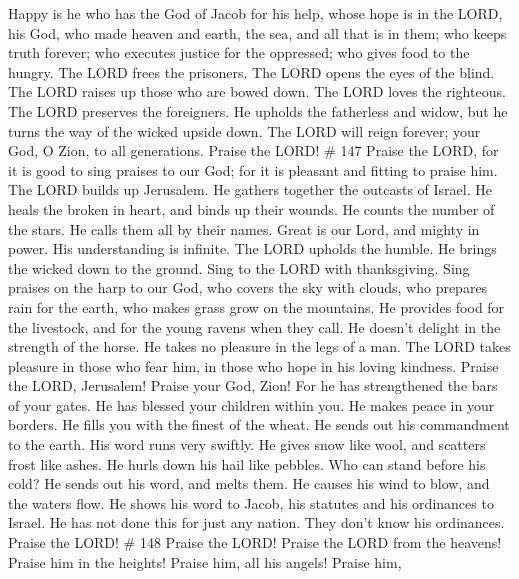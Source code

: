  Happy is he who has the God of Jacob for his help, whose
hope is in the LORD, his God,  who made heaven and earth,
the sea, and all that is in them; who keeps truth forever; 
who executes justice for the oppressed; who gives food to the hungry.
The LORD frees the prisoners.  The LORD opens the eyes of
the blind. The LORD raises up those who are bowed down. The LORD loves
the righteous.  The LORD preserves the foreigners. He
upholds the fatherless and widow, but he turns the way of the wicked
upside down.  The LORD will reign forever; your God, O
Zion, to all generations. Praise the LORD! \# 147  Praise
the LORD, for it is good to sing praises to our God; for it is pleasant
and fitting to praise him.  The LORD builds up Jerusalem. He
gathers together the outcasts of Israel.  He heals the
broken in heart, and binds up their wounds.  He counts the
number of the stars. He calls them all by their names. 
Great is our Lord, and mighty in power. His understanding is infinite.
 The LORD upholds the humble. He brings the wicked down to
the ground.  Sing to the LORD with thanksgiving. Sing
praises on the harp to our God,  who covers the sky with
clouds, who prepares rain for the earth, who makes grass grow on the
mountains.  He provides food for the livestock, and for the
young ravens when they call.  He doesn't delight in the
strength of the horse. He takes no pleasure in the legs of a man.
 The LORD takes pleasure in those who fear him, in those
who hope in his loving kindness.  Praise the LORD,
Jerusalem! Praise your God, Zion!  For he has strengthened
the bars of your gates. He has blessed your children within you.
 He makes peace in your borders. He fills you with the
finest of the wheat.  He sends out his commandment to the
earth. His word runs very swiftly.  He gives snow like
wool, and scatters frost like ashes.  He hurls down his
hail like pebbles. Who can stand before his cold?  He sends
out his word, and melts them. He causes his wind to blow, and the waters
flow.  He shows his word to Jacob, his statutes and his
ordinances to Israel.  He has not done this for just any
nation. They don't know his ordinances. Praise the LORD! \# 148
 Praise the LORD! Praise the LORD from the heavens! Praise
him in the heights!  Praise him, all his angels! Praise him,
